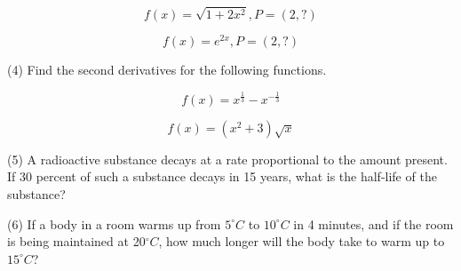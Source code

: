 \documentclass[11pt]{article}
\begin{document}
\begin{equation}
  \label{eq:heijeivo}
  f(x)=\sqrt{1+2x^{2}}, P=(2,?)
\end{equation}

\begin{equation}
  \label{eq:jeimouti}
  f(x)=e^{2x}, P=(2,?)
\end{equation}

(4) Find the second derivatives for the following functions.

\begin{equation}
  \label{eq:eaghohpo}
  f(x)=x^{\frac{1}{3}}-x^{-\frac{1}{3}}
\end{equation}

\begin{equation}
  \label{eq:boopeesh}
  f(x)=(x^{2}+3)\sqrt{x}
\end{equation}

(5) A radioactive substance decays at a rate proportional to the
amount present. If 30 percent of such a substance decays in 15 years,
what is the half-life of the substance?

(6) If a body in a room warms up from $5^{\circ}C$ to $10^{\circ}C$ in
4 minutes, and if the room is being maintained at 20$^{\circ}C$, how
much longer will the body take to warm up to $15^{\circ}C$?



\end{document}
